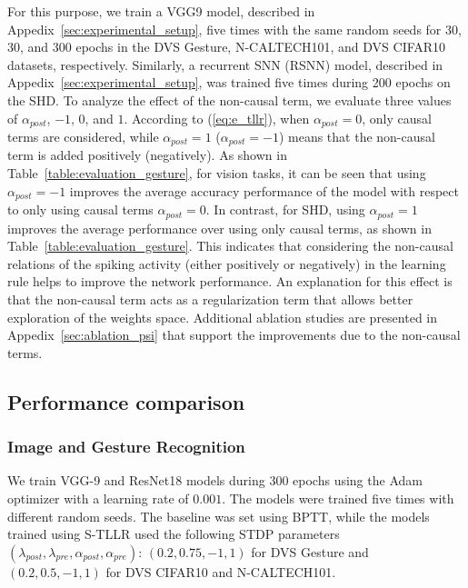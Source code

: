 \documentclass[10pt]{article} %
\begin{document}
    For this purpose, we train a VGG9 model, described in Appedix~\ref{sec:experimental_setup}, five times with the same random seeds for 30, 30, and 300 epochs in the DVS Gesture, N-CALTECH101, and DVS CIFAR10 datasets, respectively. 
    Similarly, a recurrent SNN (RSNN) model, described in Appedix~\ref{sec:experimental_setup}, was trained five times during 200 epochs on the SHD.
    To analyze the effect of the non-causal term, we evaluate three values of $\alpha_{post}$, $-1$, $0$, and $1$.
    According to (\ref{eq:e_tllr}), when $\alpha_{post}=0$, only causal terms are considered, while $\alpha_{post}=1$ ($\alpha_{post}=-1$) means that the non-causal term is added positively (negatively).
    As shown in Table~\ref{table:evaluation_gesture}, for vision tasks, it can be seen that using $\alpha_{post}=-1$ improves the average accuracy performance of the model with respect to only using causal terms $\alpha_{post}=0$.
    In contrast, for SHD, using $\alpha_{post}=1$ improves the average performance over using only causal terms, as shown in Table~\ref{table:evaluation_gesture}.
    This indicates that considering the non-causal relations of the spiking activity (either positively or negatively) in the learning rule helps to improve the network performance.
    An explanation for this effect is that the non-causal term acts as a regularization term that allows better exploration of the weights space.
    Additional ablation studies are presented in Appedix~\ref{sec:ablation_psi} that support the improvements due to the non-causal terms.
    
    
    \subsection{Performance comparison}\label{sec:performacne_comparison}
        
        \subsubsection{Image and Gesture Recognition}\label{sec:image_experiments}

        We train VGG-9 and ResNet18 models during $300$ epochs using the Adam optimizer with a learning rate of $0.001$.
        The models were trained five times with different random seeds. 
        The baseline was set using BPTT, while the models trained using S-TLLR used the following STDP parameters $(\lambda_{post}, \lambda_{pre}, \alpha_{post}, \alpha_{pre})$:  $(0.2, 0.75, -1, 1)$ for DVS Gesture and $(0.2, 0.5, -1, 1)$ for DVS CIFAR10 and N-CALTECH101.
\end{document}

